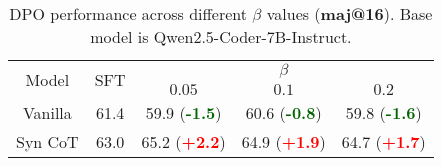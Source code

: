 \begin{table}[h!]
    \centering
\begin{adjustbox}{max width=\columnwidth}
    \begin{tabular}{c | c | c c c }
    \toprule
    \multirow{2}{*}{Model} & \multirow{2}{*}{SFT} & \multicolumn{3}{c}{\textbf{$\beta$}} \\
    & & $0.05$ & $0.1$ & $0.2$ \\
    \midrule
    Vanilla & 61.4 & 59.9 (\textbf{\textcolor{darkgreen}{-1.5}}) & 60.6 (\textbf{\textcolor{darkgreen}{-0.8}}) & 59.8 (\textbf{\textcolor{darkgreen}{-1.6}})\\
    Syn CoT & 63.0 & 65.2 (\textbf{\textcolor{red}{+2.2}}) & 64.9 (\textbf{\textcolor{red}{+1.9}})& 64.7 (\textbf{\textcolor{red}{+1.7}}) \\
    \bottomrule
    \end{tabular}
\end{adjustbox}
\caption{DPO performance across different $\beta$ values (\textbf{maj@16}). Base model is Qwen2.5-Coder-7B-Instruct.}
\end{table}